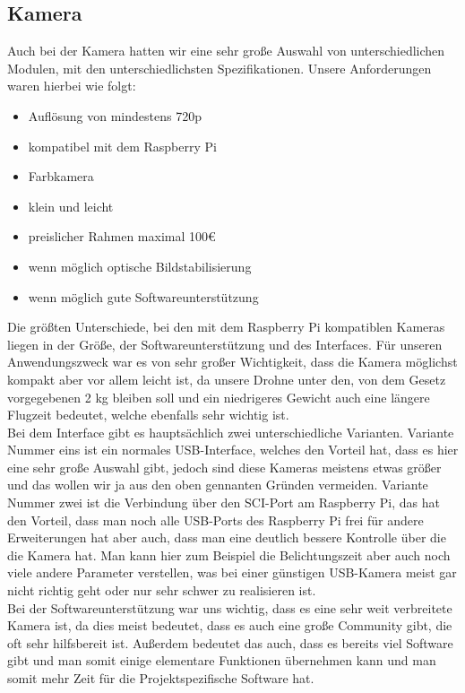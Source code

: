 \subsection{Kamera}
Auch bei der Kamera hatten wir eine sehr große Auswahl von unterschiedlichen Modulen, mit den unterschiedlichsten Spezifikationen. Unsere Anforderungen waren hierbei  wie folgt:
\begin{itemize}
	\item Auflösung von mindestens 720p
	\item kompatibel mit dem Raspberry Pi
	\item Farbkamera
	\item klein und leicht
	\item preislicher Rahmen maximal 100€
	\item wenn möglich optische Bildstabilisierung
	\item wenn möglich gute Softwareunterstützung
\end{itemize}
Die größten Unterschiede, bei den mit dem Raspberry Pi kompatiblen Kameras liegen in der Größe, der Softwareunterstützung und des Interfaces. Für unseren Anwendungszweck war es von sehr großer Wichtigkeit, dass die Kamera möglichst kompakt aber vor allem leicht ist, da unsere Drohne unter den, von dem Gesetz vorgegebenen 2 kg bleiben soll und ein niedrigeres Gewicht auch eine längere Flugzeit bedeutet, welche ebenfalls sehr wichtig ist.\\
Bei dem Interface gibt es hauptsächlich zwei unterschiedliche Varianten. Variante Nummer eins ist ein normales USB-Interface, welches den Vorteil hat, dass es hier eine sehr große Auswahl gibt, jedoch sind diese Kameras meistens etwas größer und das wollen wir ja aus den oben gennanten Gründen vermeiden. Variante Nummer zwei ist die Verbindung über den SCI-Port am Raspberry Pi, das hat den Vorteil, dass man noch alle USB-Ports des Raspberry Pi frei für andere Erweiterungen hat aber auch, dass man eine deutlich bessere Kontrolle über die die Kamera hat. Man kann hier zum Beispiel die Belichtungszeit aber auch noch viele andere Parameter verstellen, was bei einer günstigen USB-Kamera meist gar nicht richtig geht oder nur sehr schwer zu realisieren ist.\\
Bei der Softwareunterstützung war uns wichtig, dass es eine sehr weit verbreitete Kamera ist, da dies meist bedeutet, dass es auch eine große Community gibt, die oft sehr hilfsbereit ist. Außerdem bedeutet das auch, dass es bereits viel Software gibt und man somit einige elementare Funktionen übernehmen kann und man somit mehr Zeit für die Projektspezifische Software hat.\\
